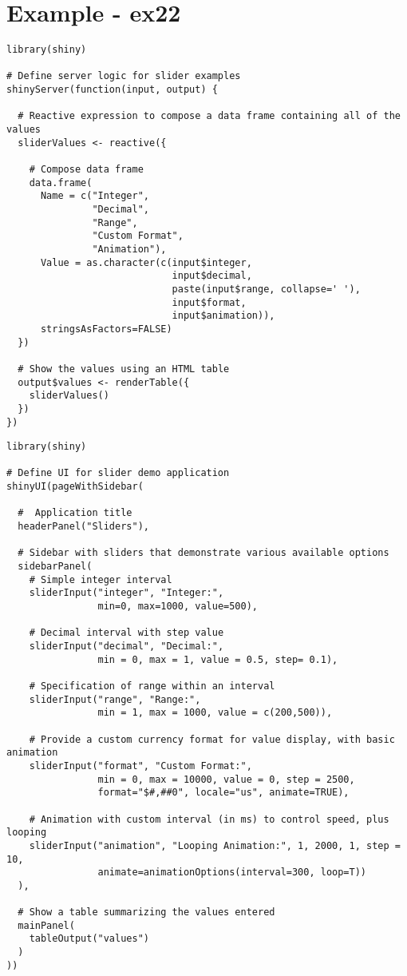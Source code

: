 \documentclass[a4paper,12pt]{article}
\begin{document}
\section*{Example - ex22}
\begin{framed}
\begin{verbatim}
library(shiny)

# Define server logic for slider examples
shinyServer(function(input, output) {

  # Reactive expression to compose a data frame containing all of the values
  sliderValues <- reactive({

    # Compose data frame
    data.frame(
      Name = c("Integer", 
               "Decimal",
               "Range",
               "Custom Format",
               "Animation"),
      Value = as.character(c(input$integer, 
                             input$decimal,
                             paste(input$range, collapse=' '),
                             input$format,
                             input$animation)), 
      stringsAsFactors=FALSE)
  }) 

  # Show the values using an HTML table
  output$values <- renderTable({
    sliderValues()
  })
})
\end{verbatim}
\end{framed}

\newpage
\begin{framed}
\begin{verbatim}
library(shiny)

# Define UI for slider demo application
shinyUI(pageWithSidebar(

  #  Application title
  headerPanel("Sliders"),

  # Sidebar with sliders that demonstrate various available options
  sidebarPanel(
    # Simple integer interval
    sliderInput("integer", "Integer:", 
                min=0, max=1000, value=500),

    # Decimal interval with step value
    sliderInput("decimal", "Decimal:", 
                min = 0, max = 1, value = 0.5, step= 0.1),

    # Specification of range within an interval
    sliderInput("range", "Range:",
                min = 1, max = 1000, value = c(200,500)),

    # Provide a custom currency format for value display, with basic animation
    sliderInput("format", "Custom Format:", 
                min = 0, max = 10000, value = 0, step = 2500,
                format="$#,##0", locale="us", animate=TRUE),

    # Animation with custom interval (in ms) to control speed, plus looping
    sliderInput("animation", "Looping Animation:", 1, 2000, 1, step = 10, 
                animate=animationOptions(interval=300, loop=T))
  ),

  # Show a table summarizing the values entered
  mainPanel(
    tableOutput("values")
  )
))
\end{verbatim}
\end{framed}
\end{document}

